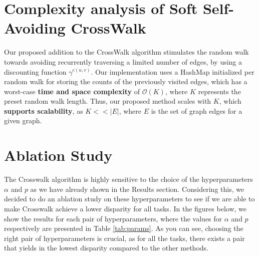 \section{Complexity analysis of Soft Self-Avoiding CrossWalk}
\label{app:complexity}

Our proposed addition to the CrossWalk algorithm stimulates the random walk towards avoiding recurrently traversing a limited number of edges, by using a discounting function $\gamma^{c(u, v)}$. Our implementation uses a HashMap initialized per random walk for storing the counts of the previously visited edges, which has a worst-case \textbf{time and space complexity} of $\mathcal{O}(K)$, where $K$ represents the preset random walk length. Thus, our proposed method scales with $K$, which \textbf{supports scalability}, as $K << |E|$, where $E$ is the set of graph edges for a given graph.

\section{Ablation Study}
 \label{sec.ablation}

The Crosswalk algorithm is highly sensitive to the choice of the hyperparameters $\alpha$ and $p$ as we have already shown in the Results section. Considering this, we decided to do an ablation study on these hyperparameters to see if we are able to make Crosswalk achieve a lower disparity for all tasks. In the figures below, we show the results for each pair of hyperparameters, where the values for $\alpha$ and $p$ respectively are presented in Table \ref{tab:params}. As you can see, choosing the right pair of hyperparameters is crucial, as for all the tasks, there exists a pair that yields in the lowest disparity compared to the other methods.

